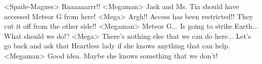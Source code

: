 <Spade-Magnes> Raaaaaarrr!! 
<Megaman> Jack and Ms. Tia should have accessed Meteor G from here! 
<Mega> Argh!! Access has been restricted!! 
They cut it off from the other side!! 
<Megaman> Meteor G... Is going to strike Earth... 
What should we do!? 
<Mega> There's nothing else that we can do here... 
Let's go back and ask that Heartless lady if she knows anything that can help. 
<Megaman> Good idea. 
Maybe she knows something that we don't! 
